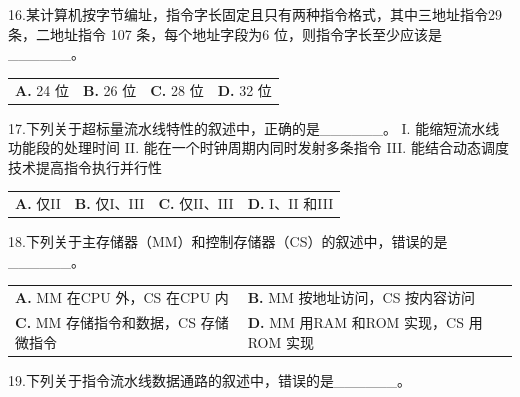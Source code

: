 \documentclass[UTF8,11pt]{ctexart}
\begin{document}
16.某计算机按字节编址，指令字长固定且只有两种指令格式，其中三地址指令29 条，二地址指令 107 条，每个地址字段为6 位，则指令字长至少应该是\_\_\_\_\_\_。


\begin{center}\begin{tabular}{>{\raggedright\arraybackslash}p{\dimexpr(\linewidth-8\tabcolsep)/4\relax}>{\raggedright\arraybackslash}p{\dimexpr(\linewidth-8\tabcolsep)/4\relax}>{\raggedright\arraybackslash}p{\dimexpr(\linewidth-8\tabcolsep)/4\relax}>{\raggedright\arraybackslash}p{\dimexpr(\linewidth-8\tabcolsep)/4\relax}}
\textbf{A.} 24 位 & \textbf{B.} 26 位 & \textbf{C.} 28 位 & \textbf{D.} 32 位\\[.35em]\end{tabular}\end{center}

17.下列关于超标量流水线特性的叙述中，正确的是\_\_\_\_\_\_。 I. 能缩短流水线功能段的处理时间 II. 能在一个时钟周期内同时发射多条指令 III. 能结合动态调度技术提高指令执行并行性


\begin{center}\begin{tabular}{>{\raggedright\arraybackslash}p{\dimexpr(\linewidth-8\tabcolsep)/4\relax}>{\raggedright\arraybackslash}p{\dimexpr(\linewidth-8\tabcolsep)/4\relax}>{\raggedright\arraybackslash}p{\dimexpr(\linewidth-8\tabcolsep)/4\relax}>{\raggedright\arraybackslash}p{\dimexpr(\linewidth-8\tabcolsep)/4\relax}}
\textbf{A.} 仅II & \textbf{B.} 仅I、III & \textbf{C.} 仅II、III & \textbf{D.} I、II 和III\\[.35em]\end{tabular}\end{center}

18.下列关于主存储器（MM）和控制存储器（CS）的叙述中，错误的是\_\_\_\_\_\_。


\begin{center}\begin{tabular}{>{\raggedright\arraybackslash}p{\dimexpr(\linewidth-4\tabcolsep)/2\relax}>{\raggedright\arraybackslash}p{\dimexpr(\linewidth-4\tabcolsep)/2\relax}}
\textbf{A.} MM 在CPU 外，CS 在CPU 内 & \textbf{B.} MM 按地址访问，CS 按内容访问\\[.35em]
\textbf{C.} MM 存储指令和数据，CS 存储微指令 & \textbf{D.} MM 用RAM 和ROM 实现，CS 用ROM 实现\\[.35em]\end{tabular}\end{center}

19.下列关于指令流水线数据通路的叙述中，错误的是\_\_\_\_\_\_。
\end{document}
